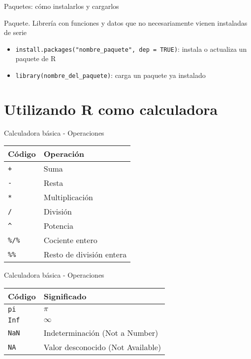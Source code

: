 \documentclass[
  ignorenonframetext,
]{beamer}
\providecommand{\tightlist}{%
  \setlength{\itemsep}{0pt}\setlength{\parskip}{0pt}}
\begin{document}
\begin{frame}[fragile]{Paquetes: cómo instalarlos y cargarlos}
\protect\hypertarget{paquetes-cuxf3mo-instalarlos-y-cargarlos}{}

Paquete. Librería con funciones y datos que no necesariamente vienen
instaladas de serie

\begin{itemize}
\tightlist
\item
  \texttt{install.packages("nombre\_paquete",\ dep\ =\ TRUE)}: instala o
  actualiza un paquete de R
\item
  \texttt{library(nombre\_del\_paquete)}: carga un paquete ya instalado
\end{itemize}

\end{frame}

\hypertarget{utilizando-r-como-calculadora}{%
\section{Utilizando R como
calculadora}\label{utilizando-r-como-calculadora}}

\begin{frame}[fragile]{Calculadora básica - Operaciones}
\protect\hypertarget{calculadora-buxe1sica---operaciones}{}

\begin{longtable}[]{@{}ll@{}}
\toprule
Código & Operación\tabularnewline
\midrule
\endhead
\texttt{+} & Suma\tabularnewline
\texttt{-} & Resta\tabularnewline
\texttt{*} & Multiplicación\tabularnewline
\texttt{/} & División\tabularnewline
\texttt{\^{}} & Potencia\tabularnewline
\texttt{\%/\%} & Cociente entero\tabularnewline
\texttt{\%\%} & Resto de división entera\tabularnewline
\bottomrule
\end{longtable}

\end{frame}

\begin{frame}[fragile]{Calculadora básica - Operaciones}
\protect\hypertarget{calculadora-buxe1sica---operaciones-1}{}

\begin{longtable}[]{@{}ll@{}}
\toprule
Código & Significado\tabularnewline
\midrule
\endhead
\texttt{pi} &
\href{https://es.wikipedia.org/wiki/Número_pi}{\(\pi\)}\tabularnewline
\texttt{Inf} &
\href{https://es.wikipedia.org/wiki/Infinito}{\(\infty\)}\tabularnewline
\texttt{NaN} & Indeterminación (Not a Number)\tabularnewline
\texttt{NA} & Valor desconocido (Not Available)\tabularnewline
\bottomrule
\end{longtable}

\end{frame}
\end{document}
